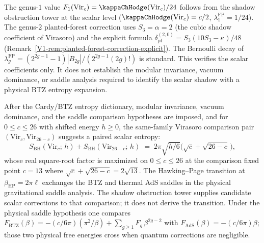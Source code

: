 \begin{remark}[Evidence]
The genus-$1$ value
$F_1(\mathrm{Vir}_c)=\kappaChHodge(\mathrm{Vir}_c)/24$ follows from
the shadow obstruction tower at the scalar level
($\kappaChHodge(\mathrm{Vir}_c) = c/2$,
$\lambda_1^{\mathrm{FP}} = 1/24$).
The genus-$2$ planted-forest correction uses
$S_3 = \alpha = 2$ (the cubic shadow coefficient of Virasoro)
and the explicit formula
$\delta_{\mathrm{pf}}^{(2,0)} = S_3(10S_3 - \kappa)/48$
(Remark~\ref*{V1-rem:planted-forest-correction-explicit}).
The Bernoulli decay of $\lambda_g^{\mathrm{FP}}
= (2^{2g-1}-1)|B_{2g}|/(2^{2g-1}(2g)!)$ is standard.
This verifies the scalar coefficients only. It does not establish
the modular invariance, vacuum dominance, or saddle analysis required
to identify the scalar shadow with a physical BTZ entropy expansion.
\end{remark}

\begin{remark}
\label{rem:gravity-btz-complementarity}
After the Cardy/BTZ entropy dictionary, modular invariance, vacuum
dominance, and the saddle comparison hypotheses are imposed, and for
\(0\le c\le26\) with shifted energy \(h\ge0\), the same-family
Virasoro comparison pair \((\mathrm{Vir}_c,\mathrm{Vir}_{26-c})\)
suggests a paired scalar entropy:
\[
S_{\mathrm{BH}}(\mathrm{Vir}_c;\, h)
+ S_{\mathrm{BH}}(\mathrm{Vir}_{26-c};\, h)
\;=\;
2\pi\sqrt{h/6}\bigl(\sqrt{c} + \sqrt{26-c}\,\bigr),
\]
whose real square-root factor is maximized on \(0\le c\le26\) at the
comparison fixed point $c = 13$ where
$\sqrt{c} + \sqrt{26-c} = 2\sqrt{13}$.
The Hawking--Page transition at
\(\beta_{\mathrm{HP}} = 2\pi\ell\) exchanges the BTZ and
thermal AdS saddles in the physical gravitational saddle analysis.
The shadow obstruction tower supplies candidate scalar corrections to
that comparison; it does not derive the transition. Under the
physical saddle hypothesis one compares
$F_{\mathrm{BTZ}}(\beta)
= -(c/6\pi)(\pi^2/\beta)
+ \sum_{g \ge 1} F_g\,\beta^{2g-2}$
with \(F_{\mathrm{AdS}}(\beta)=-(c/6\pi)\beta\); those two physical
free energies cross when quantum corrections are negligible.
\end{remark}

